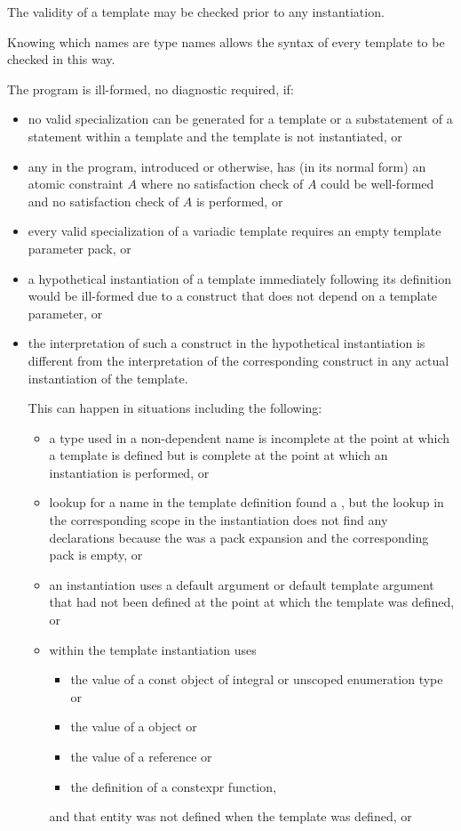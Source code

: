 \pnum
{}%
%
The validity of a template may be checked prior to any instantiation.
\begin{note}
Knowing which names are type names allows the syntax of every template
to be checked in this way.
\end{note}
The program is ill-formed, no diagnostic required, if:
\begin{itemize}
\item
no valid specialization can be generated for a template
or a substatement of a  statement within a template
and the template is not instantiated, or
\item
any  in the program, introduced or otherwise,
has (in its normal form) an atomic constraint $A$ where
no satisfaction check of $A$ could be well-formed and
no satisfaction check of $A$ is performed, or
\item
every valid specialization of a variadic template requires an empty template
parameter pack, or
\item
a hypothetical instantiation of a template
immediately following its definition
would be ill-formed
due to a construct that does not depend on a template parameter, or
\item
the interpretation of such a construct
in the hypothetical instantiation
is different from
the interpretation of the corresponding construct
in any actual instantiation of the template.
\begin{note}
This can happen in situations including the following:
\begin{itemize}
\item a type used in a non-dependent name is incomplete at the point at which a
template is defined but is complete at the point at which an instantiation is
performed, or

\item lookup for a name in the template definition found a ,
but the lookup in the corresponding scope in the instantiation
does not find any declarations because the 
was a pack expansion and the corresponding pack is empty, or

\item an instantiation uses a default argument or default template argument
that had not been defined at the point at which the template was defined, or

\item {} within the template
instantiation uses
  \begin{itemize}
  \item the value of a const object of integral or unscoped enumeration type or
  \item the value of a  object or
  \item the value of a reference or
  \item the definition of a constexpr function,
  \end{itemize}
and that entity was not defined when the template was defined, or


\end{itemize}
\end{note}
\end{itemize}
